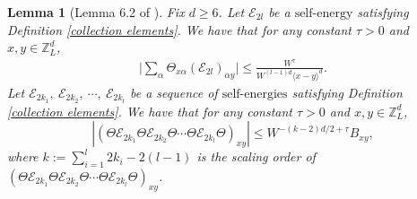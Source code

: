 \documentclass{article}
\newcommand{\1}{\mathds{1}}
\numberwithin{equation}{section}
\newcommand{\al}{\alpha}
\newcommand{\be}{\begin{equation}}
\newcommand{\ee}{\end{equation}}
\renewcommand{\leq}{\leqslant}
\renewcommand{\geq}{\geqslant}
\renewcommand{\le}{\leq}
\renewcommand{\ge}{\geq}
\newcommand{\Z}{\mathbb{Z}}
\newcommand{\self}{\text{self-energy}}
\newcommand{\selfs}{\text{self-energies}}
\theoremstyle{plain} %
\newtheorem{lemma}[theorem]{Lemma}
\theoremstyle{remark}
\newcommand{\Sele}{{\mathcal E}}
\newcommand{\Selek}{{\mathcal E}}
\begin{document}
\begin{lemma}[Lemma 6.2 of \cite{PartI_high}]\label{lem redundantagain}
 Fix $d\ge 6$. Let $\Selek_{2l} $ be a $\self$ satisfying Definition \ref{collection elements}. We have that for any constant $\tau>0$ and $x,y \in \Z_L^d$,
	\begin{align}\label{redundant again}
		\Big| \sum_{\al}\Theta_{x \al} (\Selek_{2l})_{\al y}\Big| \le \frac{W^\tau}{W^{(l-1)d}\langle x-y\rangle^d } .
	\end{align}
	Let $\Sele_{2k_1}, \ \Sele_{2k_2},\ \cdots , \ \Sele_{2k_l} $ be a sequence of $\selfs$ satisfying Definition \ref{collection elements}. We have that for any constant $\tau>0$ and $x,y \in \Z_L^d$,
	\be\label{BRB} 
	\left|\left(\Theta \Sele_{2k_1}\Theta  \Sele_{2k_2}\Theta \cdots \Theta  \Sele_{2k_l}\Theta\right)_{xy}\right|\le W^{-(k-2)d/2+\tau}B_{xy}  , \ee
	where $k:=\sum_{i=1}^l  2k_i -2(l-1)$ is the scaling order of $\left(\Theta \Sele_{2k_1}\Theta  \Sele_{2k_2}\Theta \cdots \Theta  \Sele_{2k_l}\Theta\right)_{xy}$.
\end{lemma}
\end{document}
